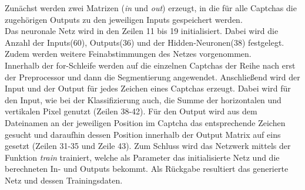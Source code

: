 Zunächst werden zwei Matrizen (\textit{in} und \textit{out}) erzeugt, in die für alle Captchas die zugehörigen Outputs zu den jeweiligen Inputs gespeichert werden.\\
Das neuronale Netz wird in den Zeilen 11 bis 19 initialisiert. Dabei wird die Anzahl der Inputs(60), Outputs(36) und der Hidden-Neuronen(38) festgelegt. Zudem werden weitere Feinabstimmungen des Netzes vorgenommen.\\
Innerhalb der for-Schleife werden auf die einzelnen Captchas der Reihe nach erst der Preprocessor und dann die Segmentierung angewendet. Anschließend wird der Input und der Output für jedes Zeichen eines Captchas erzeugt. Dabei wird für den Input, wie bei der Klassifizierung auch, die Summe der horizontalen und vertikalen Pixel genutzt (Zeilen 38-42). Für den Output wird aus dem Dateinamen an der jeweiligen Position im Captcha das entsprechende Zeichen gesucht und daraufhin dessen Position innerhalb der Output Matrix auf eins gesetzt (Zeilen 31-35 und Zeile 43). Zum Schluss wird das Netzwerk mittels der Funktion \textit{train} trainiert, welche als Parameter das initialisierte Netz und die berechneten In- und Outputs bekommt. Als Rückgabe resultiert das generierte Netz und dessen Trainingsdaten.

\newpage
